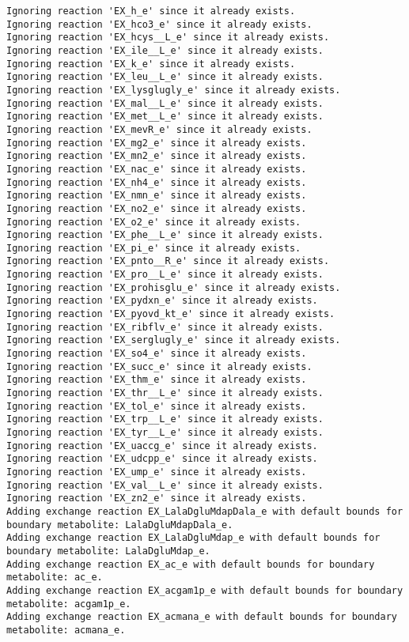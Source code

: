 \documentclass[
  letterpaper,
  DIV=11,
  numbers=noendperiod]{scrartcl}
\begin{document}
\begin{verbatim}
Ignoring reaction 'EX_h_e' since it already exists.
Ignoring reaction 'EX_hco3_e' since it already exists.
Ignoring reaction 'EX_hcys__L_e' since it already exists.
Ignoring reaction 'EX_ile__L_e' since it already exists.
Ignoring reaction 'EX_k_e' since it already exists.
Ignoring reaction 'EX_leu__L_e' since it already exists.
Ignoring reaction 'EX_lysglugly_e' since it already exists.
Ignoring reaction 'EX_mal__L_e' since it already exists.
Ignoring reaction 'EX_met__L_e' since it already exists.
Ignoring reaction 'EX_mevR_e' since it already exists.
Ignoring reaction 'EX_mg2_e' since it already exists.
Ignoring reaction 'EX_mn2_e' since it already exists.
Ignoring reaction 'EX_nac_e' since it already exists.
Ignoring reaction 'EX_nh4_e' since it already exists.
Ignoring reaction 'EX_nmn_e' since it already exists.
Ignoring reaction 'EX_no2_e' since it already exists.
Ignoring reaction 'EX_o2_e' since it already exists.
Ignoring reaction 'EX_phe__L_e' since it already exists.
Ignoring reaction 'EX_pi_e' since it already exists.
Ignoring reaction 'EX_pnto__R_e' since it already exists.
Ignoring reaction 'EX_pro__L_e' since it already exists.
Ignoring reaction 'EX_prohisglu_e' since it already exists.
Ignoring reaction 'EX_pydxn_e' since it already exists.
Ignoring reaction 'EX_pyovd_kt_e' since it already exists.
Ignoring reaction 'EX_ribflv_e' since it already exists.
Ignoring reaction 'EX_serglugly_e' since it already exists.
Ignoring reaction 'EX_so4_e' since it already exists.
Ignoring reaction 'EX_succ_e' since it already exists.
Ignoring reaction 'EX_thm_e' since it already exists.
Ignoring reaction 'EX_thr__L_e' since it already exists.
Ignoring reaction 'EX_tol_e' since it already exists.
Ignoring reaction 'EX_trp__L_e' since it already exists.
Ignoring reaction 'EX_tyr__L_e' since it already exists.
Ignoring reaction 'EX_uaccg_e' since it already exists.
Ignoring reaction 'EX_udcpp_e' since it already exists.
Ignoring reaction 'EX_ump_e' since it already exists.
Ignoring reaction 'EX_val__L_e' since it already exists.
Ignoring reaction 'EX_zn2_e' since it already exists.
Adding exchange reaction EX_LalaDgluMdapDala_e with default bounds for boundary metabolite: LalaDgluMdapDala_e.
Adding exchange reaction EX_LalaDgluMdap_e with default bounds for boundary metabolite: LalaDgluMdap_e.
Adding exchange reaction EX_ac_e with default bounds for boundary metabolite: ac_e.
Adding exchange reaction EX_acgam1p_e with default bounds for boundary metabolite: acgam1p_e.
Adding exchange reaction EX_acmana_e with default bounds for boundary metabolite: acmana_e.

\end{verbatim}
\end{document}

